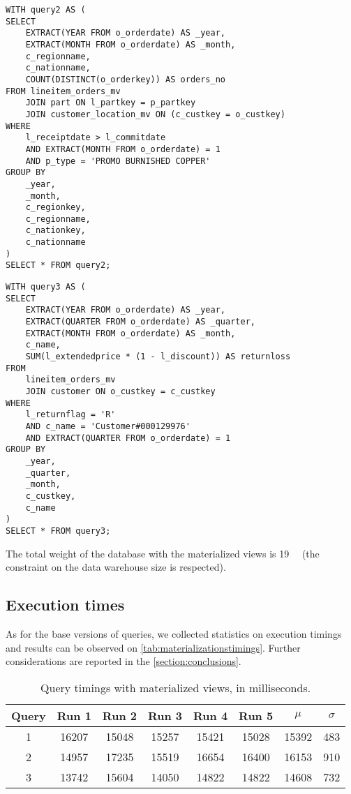 \begin{lstlisting}
WITH query2 AS (
SELECT 
	EXTRACT(YEAR FROM o_orderdate) AS _year,
	EXTRACT(MONTH FROM o_orderdate) AS _month,
	c_regionname,
	c_nationname,
	COUNT(DISTINCT(o_orderkey)) AS orders_no
FROM lineitem_orders_mv
	JOIN part ON l_partkey = p_partkey
	JOIN customer_location_mv ON (c_custkey = o_custkey)
WHERE 
	l_receiptdate > l_commitdate
	AND EXTRACT(MONTH FROM o_orderdate) = 1
	AND p_type = 'PROMO BURNISHED COPPER'
GROUP BY
	_year,
	_month,
	c_regionkey,
	c_regionname,
	c_nationkey,
	c_nationname
)
SELECT * FROM query2;
\end{lstlisting}

\begin{lstlisting}
WITH query3 AS (
SELECT
	EXTRACT(YEAR FROM o_orderdate) AS _year,
	EXTRACT(QUARTER FROM o_orderdate) AS _quarter,
	EXTRACT(MONTH FROM o_orderdate) AS _month,
	c_name,
	SUM(l_extendedprice * (1 - l_discount)) AS returnloss
FROM
	lineitem_orders_mv
	JOIN customer ON o_custkey = c_custkey
WHERE 
	l_returnflag = 'R'
	AND c_name = 'Customer#000129976'
	AND EXTRACT(QUARTER FROM o_orderdate) = 1
GROUP BY
	_year,
	_quarter,
	_month,
	c_custkey,
	c_name
)
SELECT * FROM query3;
\end{lstlisting}

The total weight of the database with the materialized views is \SI{19}{\giga\byte} (the constraint on the data warehouse size is respected).


\subsection{Execution times}

As for the base versions of queries, we collected statistics on execution timings and results can be observed on \autoref{tab:materializationstimings}. Further considerations are reported in the \autoref{section:conclusions}.

\begin{table}[!h]
\centering
\begin{tabular}{|| c | c c c c c | c c ||} 
 \hline
 Query & Run 1 & Run 2 & Run 3 & Run 4 & Run 5 & 	$\mu$ & $\sigma$ \\ [0.5ex] 
 \hline\hline
 1 & \num{16207} & \num{15048} & \num{15257} & \num{15421} & \num{15028} & \num{15392} & \num{483} \\ 
 \hline
 2 & \num{14957} & \num{17235} & \num{15519} & \num{16654} & \num{16400} & \num{16153} & \num{910} \\ 
 \hline
 3 & \num{13742} & \num{15604} & \num{14050} & \num{14822} & \num{14822} & \num{14608} & \num{732} \\ 
 \hline
\end{tabular}
  \caption{Query timings with materialized views, in milliseconds.}
  \label{tab:materializationstimings}
\end{table}